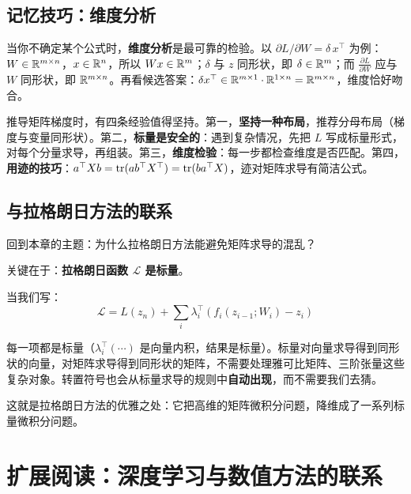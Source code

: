 \subsection*{记忆技巧：维度分析}

当你不确定某个公式时，\textbf{维度分析}是最可靠的检验。以 $\partial L/\partial W = \delta\, x^\top$ 为例：$W \in \mathbb{R}^{m \times n}$，$x \in \mathbb{R}^n$，所以 $Wx \in \mathbb{R}^m$；$\delta$ 与 $z$ 同形状，即 $\delta \in \mathbb{R}^m$；而 $\frac{\partial L}{\partial W}$ 应与 $W$ 同形状，即 $\mathbb{R}^{m \times n}$。再看候选答案：$\delta x^\top \in \mathbb{R}^{m \times 1} \cdot \mathbb{R}^{1 \times n} = \mathbb{R}^{m \times n}$，维度恰好吻合。

\begin{insightbox}[title=实用建议]
推导矩阵梯度时，有四条经验值得坚持。第一，\textbf{坚持一种布局}，推荐分母布局（梯度与变量同形状）。第二，\textbf{标量是安全的}：遇到复杂情况，先把 $L$ 写成标量形式，对每个分量求导，再组装。第三，\textbf{维度检验}：每一步都检查维度是否匹配。第四，\textbf{用迹的技巧}：$a^\top X b = \text{tr}(ab^\top X^\top) = \text{tr}(b a^\top X)$，迹对矩阵求导有简洁公式。
\end{insightbox}

\subsection*{与拉格朗日方法的联系}

回到本章的主题：为什么拉格朗日方法能避免矩阵求导的混乱？

关键在于：\textbf{拉格朗日函数 $\mathcal{L}$ 是标量}。

当我们写：
\begin{equation}
\mathcal{L} = L(z_n) + \sum_i \lambda_i^\top (f_i(z_{i-1}; W_i) - z_i)
\end{equation}

每一项都是标量（$\lambda_i^\top (\cdots)$ 是向量内积，结果是标量）。标量对向量求导得到同形状的向量，对矩阵求导得到同形状的矩阵，不需要处理雅可比矩阵、三阶张量这些复杂对象。转置符号也会从标量求导的规则中\textbf{自动出现}，而不需要我们去猜。

这就是拉格朗日方法的优雅之处：它把高维的矩阵微积分问题，降维成了一系列标量微积分问题。



\section*{扩展阅读：深度学习与数值方法的联系}

